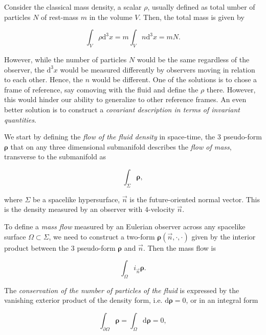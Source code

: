 Consider the classical mass density, a scalar $\rho$, usually defined as total umber of particles $N$ of rest-mass $m$ in the volume $V$. Then, the total mass is given by

\begin{equation}
\int_V \rho \text{d}^3x = m\int_V n \text{d}^3 x = mN.
\end{equation}

However, while the number of particles $N$ would be the same regardless of the observer, the $\text{d}^3x$ would be measured differently by observers moving in relation to each other. 
Hence, the $n$ would be different. 
One of the solutions is to chose a frame of reference, say comoving with the fluid and define the $\rho$ there. However, this would hinder our ability to generalize to other reference frames.
An even better solution is to construct a \textit{covariant description in terms of invariant quantities}. 

We start by defining the \textit{flow of the fluid density} in space-time, the $3$ pseudo-form $\boldsymbol{\rho}$ that on any three dimensional submanifold describes the \textit{flow of mass}, transverse to the submanifold as

\begin{equation}
\int_{\Sigma} \boldsymbol{\rho},
\end{equation}

where $\Sigma$ be a spacelike hypersurface, $\vec{n}$ is the future-oriented normal vector. 
This is the density measured by an observer with $4$-velocity $\vec{n}$. 

To define a \textit{mass flow} measured by an Eulerian observer across any spacelike surface $\Omega\subset\Sigma$, we need to construct a two-form $\boldsymbol{\rho}(\vec{n}, \cdot, \cdot)$ given by the interior product between the $3$ pseudo-form $\boldsymbol{\rho}$ and $\vec{n}$. 
Then the mass flow is 

\begin{equation}
\int_{\Omega} i_{\vec{n}}\boldsymbol{\rho}.
\end{equation}

The \textit{conservation of the number of particles of the fluid} is expressed by the vanishing exterior product of the density form, i.e. $\text{d}\boldsymbol{\rho}=0$, or in an integral form 

\begin{equation}
\int_{\partial\Omega} \boldsymbol{\rho} = \int_{\Omega}\text{d}\boldsymbol{\rho} = 0,
\end{equation}

